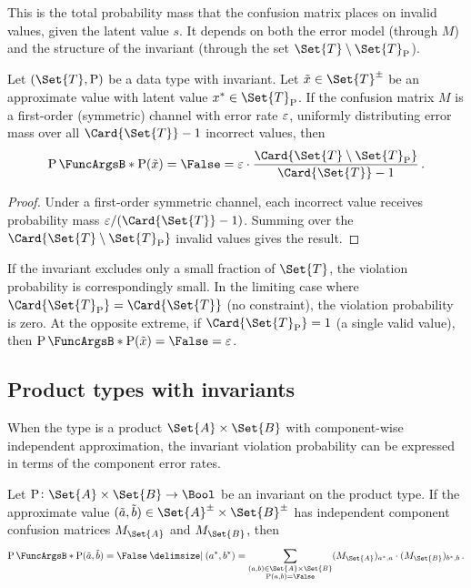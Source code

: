\documentclass[ ../main.tex]{subfiles}
\begin{document}
This is the total probability mass that the confusion matrix places on invalid values, given the latent value $s$.
It depends on both the error model (through $M$) and the structure of the invariant (through the set $\Set{T} \setminus \Set{T}_{\Fun{P}}$).

\begin{theorem}
\label{thm:violation_bound}
Let $(\Set{T}, \Fun{P})$ be a data type with invariant.
Let $\tilde{x} \in \AT{\Set{T}}$ be an approximate value with latent value $x^* \in \Set{T}_{\Fun{P}}$.
If the confusion matrix $M$ is a first-order (symmetric) channel with error rate $\varepsilon$, uniformly distributing error mass over all $\Card{\Set{T}} - 1$ incorrect values, then
\begin{equation}
\label{eq:violation_bound}
\Prob{\Fun{P}(\tilde{x}) = \False} = \fprate \cdot \frac{\Card{\Set{T} \setminus \Set{T}_{\Fun{P}}}}{\Card{\Set{T}} - 1}\,.
\end{equation}
\end{theorem}
\begin{proof}
Under a first-order symmetric channel, each incorrect value receives probability mass $\fprate / (\Card{\Set{T}} - 1)$.
Summing over the $\Card{\Set{T} \setminus \Set{T}_{\Fun{P}}}$ invalid values gives the result.
\end{proof}

\begin{corollary}
If the invariant excludes only a small fraction of $\Set{T}$, the violation probability is correspondingly small.
In the limiting case where $\Card{\Set{T}_{\Fun{P}}} = \Card{\Set{T}}$ (no constraint), the violation probability is zero.
At the opposite extreme, if $\Card{\Set{T}_{\Fun{P}}} = 1$ (a single valid value), then $\Prob{\Fun{P}(\tilde{x}) = \False} = \fprate$.
\end{corollary}

\subsection{Product types with invariants}

When the type is a product $\Set{A} \times \Set{B}$ with component-wise independent approximation, the invariant violation probability can be expressed in terms of the component error rates.

Let $\Fun{P} \colon \Set{A} \times \Set{B} \to \Bool$ be an invariant on the product type.
If the approximate value $(\tilde{a}, \tilde{b}) \in \AT{\Set{A}} \times \AT{\Set{B}}$ has independent component confusion matrices $M_{\Set{A}}$ and $M_{\Set{B}}$, then
\begin{equation}
\label{eq:product_violation}
\Prob{\Fun{P}(\tilde{a}, \tilde{b}) = \False \Given (a^*, b^*)} = \sum_{\substack{(a, b) \in \Set{A} \times \Set{B} \\ \Fun{P}(a, b) = \False}} (M_{\Set{A}})_{a^*, a} \cdot (M_{\Set{B}})_{b^*, b}\,.
\end{equation}
\end{document}
